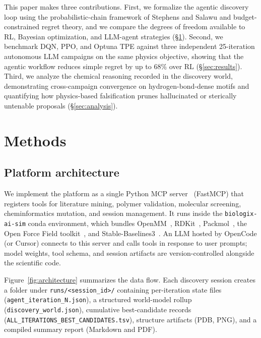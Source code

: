 \documentclass[twocolumn]{fairmeta}
\begin{document}
This paper makes three contributions.
First, we formalize the agentic discovery loop using the probabilistic-chain framework of Stephens and Salawu and budget-constrained regret theory, and we compare the degrees of freedom available to RL, Bayesian optimization, and LLM-agent strategies (\S\ref{sec:methods}).
Second, we benchmark DQN, PPO, and Optuna TPE against three independent 25-iteration autonomous LLM campaigns on the same physics objective, showing that the agentic workflow reduces simple regret by up to 68\% over RL (\S\ref{sec:results}).
Third, we analyze the chemical reasoning recorded in the discovery world, demonstrating cross-campaign convergence on hydrogen-bond-dense motifs and quantifying how physics-based falsification prunes hallucinated or sterically untenable proposals (\S\ref{sec:analysis}).

\section{Methods}
\label{sec:methods}

\subsection{Platform architecture}

We implement the platform as a single Python MCP server~\cite{mcp2024} (FastMCP) that registers tools for literature mining, polymer validation, molecular screening, cheminformatics mutation, and session management.
It runs inside the \texttt{biologix-ai-sim} conda environment, which bundles OpenMM~\cite{eastman2017openmm}, RDKit~\cite{landrum2013rdkit}, Packmol~\cite{packmol2009}, the Open Force Field toolkit~\cite{qiu2021development}, and Stable-Baselines3~\cite{sb3_2021}.
An LLM hosted by OpenCode (or Cursor) connects to this server and calls tools in response to user prompts; model weights, tool schema, and session artifacts are version-controlled alongside the scientific code.

Figure~\ref{fig:architecture} summarizes the data flow.
Each discovery session creates a folder under \texttt{runs/<session\_id>/} containing per-iteration state files (\texttt{agent\_iteration\_N.json}), a structured world-model rollup (\texttt{discovery\_world.json}), cumulative best-candidate records (\texttt{ALL\_ITERATIONS\_BEST\_CANDIDATES.tsv}), structure artifacts (PDB, PNG), and a compiled summary report (Markdown and PDF).
\end{document}
